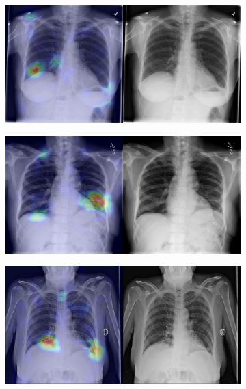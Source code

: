 \begin{figure}[b]
    \centering
    \begin{subfigure}{0.4\textwidth}
        \centering
        \includegraphics[width=1.0\textwidth]{Chapters/5. Conclusiones/img/Atelectasis/1_1_00000147_001.png}
    \end{subfigure}
    \begin{subfigure}{0.4\textwidth}
        \centering
        \includegraphics[width=1.0\textwidth]{Chapters/5. Conclusiones/img/Atelectasis/1_1_00000149_002.png}
    \end{subfigure}
    \begin{subfigure}{0.4\textwidth}
        \centering
        \includegraphics[width=1.0\textwidth]{Chapters/5. Conclusiones/img/Atelectasis/1_1_00000150_003.png}

\end{subfigure}
\end{figure}
